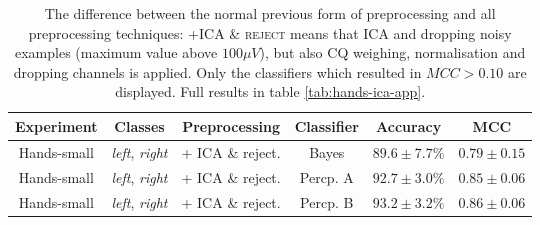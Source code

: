 \begin{table}[p]
\centering
\footnotesize{
\begin{tabular}{c|c|c|c|c|c}
    \textbf{Experiment} &  \textbf{Classes}                             & \textbf{Preprocessing}    & \textbf{Classifier}   & \textbf{Accuracy}     & \textbf{MCC}\\        \hline \hline
    Hands-small         & \textit{left}, \textit{right}                 & + ICA \& reject.          & Bayes                 &   $89.6 \pm 7.7 \%$   & $0.79 \pm 0.15$\\     \hline
    Hands-small         & \textit{left}, \textit{right}                 & + ICA \& reject.          & Percp. A              &   $92.7 \pm 3.0 \%$   & $0.85 \pm 0.06$\\     \hline
    Hands-small         & \textit{left}, \textit{right}                 & + ICA \& reject.          & Percp. B              &   $93.2 \pm 3.2 \%$   & $0.86 \pm 0.06$\\     \hline
\end{tabular}
}
\caption{The difference between the normal previous form of preprocessing and all preprocessing techniques: \textsc{+ICA \& reject} means that ICA and dropping noisy examples (maximum value above $100 \mu V$), but also CQ weighing, normalisation and dropping channels is applied. Only the classifiers which resulted in $MCC > 0.10$ are displayed. Full results in table \ref{tab:hands-ica-app}.}
\label{tab:hands-ica-results}
\end{table}



